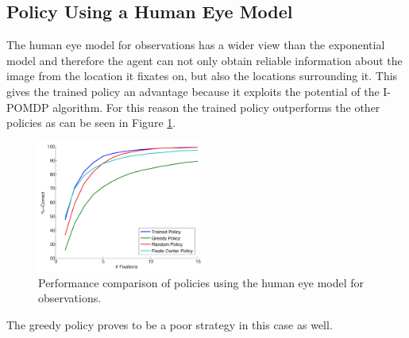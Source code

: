 \subsection{Policy Using a Human Eye Model}
The human eye model for observations has a wider view than the exponential model and therefore the agent can not only obtain reliable information about the image from the location it fixates on, but also the locations surrounding it. This gives the trained policy an advantage because it exploits the potential of the I-POMDP algorithm. For this reason the trained policy outperforms the other policies as can be seen in Figure \ref{fig:PolicyComparisonEye}.

\begin{figure}[!htp]
  \centering
  \includegraphics[width=0.5\textwidth]{figures/policy_comparison_eye2}
  \caption{Performance comparison of policies using the human eye model for observations.}
  \label{fig:PolicyComparisonEye}
\end{figure}

\noindent
The greedy policy proves to be a poor strategy in this case as well.
